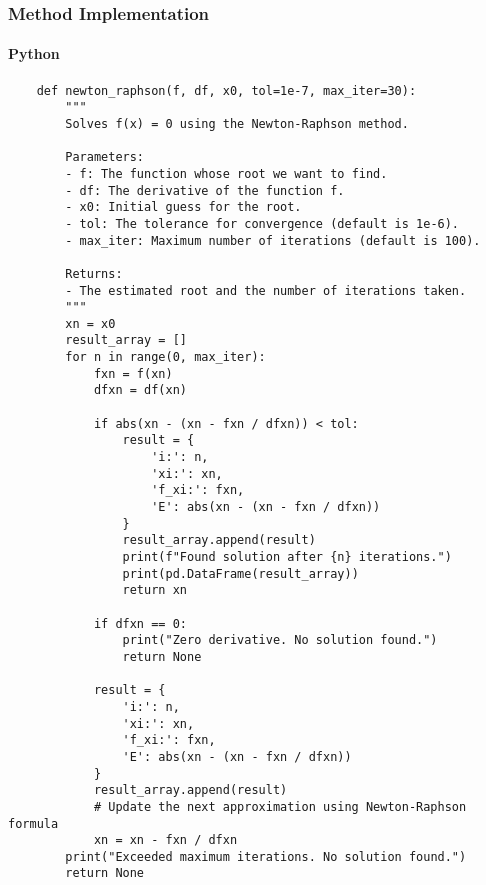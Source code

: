 \documentclass{article}
\begin{document}
        \subsubsection{Method Implementation}
            \paragraph{Python}
                \begin{verbatim}
    def newton_raphson(f, df, x0, tol=1e-7, max_iter=30):
        """
        Solves f(x) = 0 using the Newton-Raphson method.

        Parameters:
        - f: The function whose root we want to find.
        - df: The derivative of the function f.
        - x0: Initial guess for the root.
        - tol: The tolerance for convergence (default is 1e-6).
        - max_iter: Maximum number of iterations (default is 100).

        Returns:
        - The estimated root and the number of iterations taken.
        """
        xn = x0
        result_array = []
        for n in range(0, max_iter):
            fxn = f(xn)
            dfxn = df(xn)

            if abs(xn - (xn - fxn / dfxn)) < tol:
                result = {
                    'i:': n,
                    'xi:': xn,
                    'f_xi:': fxn,
                    'E': abs(xn - (xn - fxn / dfxn))
                }
                result_array.append(result)
                print(f"Found solution after {n} iterations.")
                print(pd.DataFrame(result_array))
                return xn

            if dfxn == 0:
                print("Zero derivative. No solution found.")
                return None

            result = {
                'i:': n,
                'xi:': xn,
                'f_xi:': fxn,
                'E': abs(xn - (xn - fxn / dfxn))
            }
            result_array.append(result)
            # Update the next approximation using Newton-Raphson formula
            xn = xn - fxn / dfxn
        print("Exceeded maximum iterations. No solution found.")
        return None
                \end{verbatim}
\end{document}
